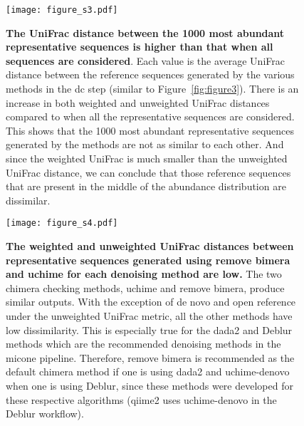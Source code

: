     \begin{figure}[H]
      \centering
      \texttt{[image: figure\_s3.pdf]}
    \end{figure}
    \begin{figure}[H]
      \centering
        \caption{
          \textbf{The UniFrac distance between the 1000 most abundant representative sequences is higher than that when all sequences are considered}.
          Each value is the average UniFrac distance between the reference sequences generated by the various methods in the \ac{dc} step (similar to Figure~\ref{fig:figure3}).
          There is an increase in both weighted and unweighted UniFrac distances compared to when all the representative sequences are considered.
          This shows that the 1000 most abundant representative sequences generated by the methods are not as similar to each other.
          And since the weighted UniFrac is much smaller than the unweighted UniFrac distance, we can conclude that those reference sequences that are present in the middle of the abundance distribution are dissimilar.
        }
      \label{fig:figure_s3}
    \end{figure}
    \FloatBarrier
    \newpage

    \begin{figure}[H]
      \centering
      \texttt{[image: figure\_s4.pdf]}
    \end{figure}
    \begin{figure}[H]
      \centering
        \caption{
          \textbf{The weighted and unweighted UniFrac distances between representative sequences generated using remove bimera and uchime for each denoising method are low.}
          The two chimera checking methods, uchime and remove bimera, produce similar outputs.
          With the exception of de novo and open reference under the unweighted UniFrac metric, all the other methods have low dissimilarity.
          This is especially true for the \ac{dada2} and Deblur methods which are the recommended denoising methods in the \ac{micone} pipeline.
          Therefore, remove bimera is recommended as the default chimera method if one is using \ac{dada2} and uchime-denovo when one is using Deblur, since these methods were developed for these respective algorithms (\ac{qiime2} uses uchime-denovo in the Deblur workflow).
        }
      \label{fig:figure_s4}
    \end{figure}
    \FloatBarrier
    \newpage

